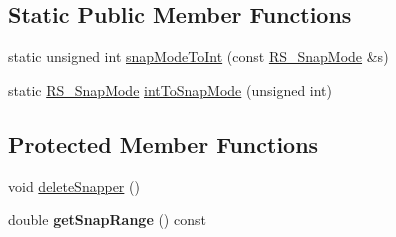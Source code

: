 \subsection*{Static Public Member Functions}
\begin{DoxyCompactItemize}
\item 
static unsigned int \hyperlink{classRS__Snapper_a4b9ba65e135b58ce3cfd55b2f8057991}{snap\-Mode\-To\-Int} (const \hyperlink{structRS__SnapMode}{R\-S\-\_\-\-Snap\-Mode} \&s)
\item 
static \hyperlink{structRS__SnapMode}{R\-S\-\_\-\-Snap\-Mode} \hyperlink{classRS__Snapper_aa57b685ebc46a8a875486f3ac4e44f84}{int\-To\-Snap\-Mode} (unsigned int)
\end{DoxyCompactItemize}
\subsection*{Protected Member Functions}
\begin{DoxyCompactItemize}
\item 
void \hyperlink{classRS__Snapper_a061036f697779d99cc0dcaf2ef9fbe3b}{delete\-Snapper} ()
\item 
\hypertarget{classRS__Snapper_a33d3d87790c96b83a16b420781b9315b}{double {\bfseries get\-Snap\-Range} () const }\label{classRS__Snapper_a33d3d87790c96b83a16b420781b9315b}

\end{DoxyCompactItemize}
